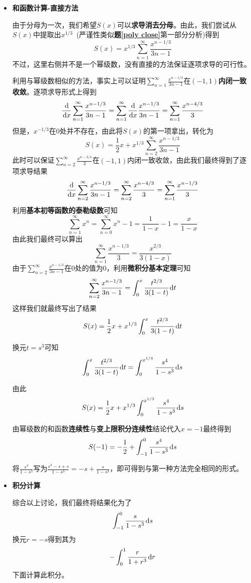 \documentclass[a4paper,UTF8,fontset=windows,AutoFakeBold]{ctexart}
\newcommand*{\dr}{\hspace{0.07em}\mathrm{d}}
\newcommand*{\suminf}[1][n=1]{\sum_{#1}^\infty}
\newcommand*{\note}{\noindent *}
\theoremstyle{ex}
\newcommand{\exref}[1]{\textbf{题\;\ref{#1}\;}}
\begin{document}
\begin{framed}
{\begin{itemize}
        由幂级数的和函数\textbf{连续性}与\textbf{变上限积分连续性}结论代入$x=-1$最终得到
        $$S(-1)=\int_{-1}^0\frac{s}{1-s^3}\dr s$$

        \item \textbf{和函数计算-直接方法}
        
        由于分母为一次，我们希望$S(x)$可以\textbf{求导消去分母}。由此，我们尝试从$S(x)$中提取出$x^{1/3}$\ (严谨性类似\exref{poly close}第一部分分析)得到
        $$S(x)=x^{1/3}\suminf\frac{x^{n-1/3}}{3n-1}$$
        不过，这里右侧并不是一个幂级数，没有直接的方法保证逐项求导的可行性。

        利用与幂级数相似的方法，事实上可以证明$\suminf\frac{x^{n-1/3}}{3n-1}$在$(-1,1)$\textbf{内闭一致收敛}。逐项求导形式上得到
        $$\frac{\dr}{\dr x}\suminf\frac{x^{n-1/3}}{3n-1}=\suminf\frac{\dr}{\dr x}\frac{x^{n-1/3}}{3n-1}=\suminf\frac{x^{n-4/3}}{3}$$
        但是，$x^{-1/3}$在0处并不存在，由此将$S(x)$的第一项拿出，转化为
        $$S(x)=\frac{1}{2}x+x^{1/3}\suminf[n=2]\frac{x^{n-1/3}}{3n-1}$$
        此时可以保证$\suminf[n=2]\frac{x^{n-3/4}}{3}$在$(-1,1)$内闭一致收敛，由此我们最终得到了逐项求导结果
        $$\frac{\dr}{\dr x}\suminf[n=2]\frac{x^{n-1/3}}{3n-1}=\suminf[n=2]\frac{x^{n-4/3}}{3}=\suminf\frac{x^{n-1/3}}{3}$$
        利用\textbf{基本初等函数的泰勒级数}可知
        $$\suminf x^n=\suminf[n=0]x^n-1=\frac{1}{1-x}-1=\frac{x}{1-x}$$
        由此我们最终可以算出
        $$\suminf\frac{x^{n-1/3}}{3}=\frac{x^{2/3}}{3(1-x)}$$
        由于$\suminf[n=2]\frac{x^{n-1/3}}{3n-1}$在0处的值为0，利用\textbf{微积分基本定理}可知
        $$\suminf[n=2]\frac{x^{n-1/3}}{3n-1}=\int_0^x\frac{t^{2/3}}{3(1-t)}\dr t$$
        这样我们就最终写出了结果
        $$S(x)=\frac{1}{2}x+x^{1/3}\int_0^x\frac{t^{2/3}}{3(1-t)}\dr t$$

        换元$t=s^3$可知
        $$\int_0^x\frac{t^{2/3}}{3(1-t)}\dr t=\int_0^{x^{1/3}}\frac{s^4}{1-s^3}\dr s$$

        由此
        $$S(x)=\frac{1}{2}x+x^{1/3}\int_0^{x^{1/3}}\frac{s^4}{1-s^3}\dr s$$

        由幂级数的和函数\textbf{连续性}与\textbf{变上限积分连续性}结论代入$x=-1$最终得到
        $$S(-1)=-\frac{1}{2}+\int_{-1}^0\frac{s^4}{1-s^3}\dr s$$

        \note 将$\frac{s^4}{1-s^3}$写为$\frac{s^4-s+s}{1-s^3}=-s+\frac{s}{1-s^3}$，即可得到与第一种方法完全相同的形式。

        \item \textbf{积分计算}
        
        综合以上讨论，我们最终将结果化为了
        $$\int_{-1}^0\frac{s}{1-s^3}\dr s$$
        换元$r=-s$得到其为
        $$-\int_0^1\frac{r}{1+r^3}\dr r$$
        下面计算此积分。


\end{itemize}}
\end{framed}
\end{document}
